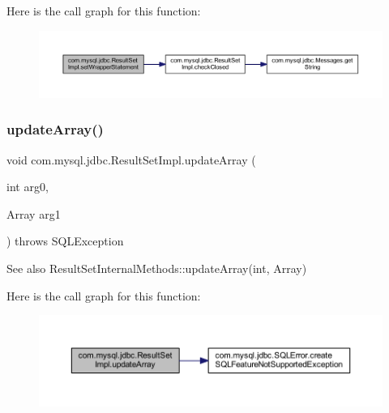Here is the call graph for this function\+:
\nopagebreak
\begin{figure}[H]
\begin{center}
\leavevmode
\includegraphics[width=350pt]{classcom_1_1mysql_1_1jdbc_1_1_result_set_impl_af945ea2fe5463f6d71b3af855fcf9dd5_cgraph}
\end{center}
\end{figure}
\mbox{\label{classcom_1_1mysql_1_1jdbc_1_1_result_set_impl_a0661c3eec2182123467ad3461928515c}} 
\subsubsection{\texorpdfstring{update\+Array()}{updateArray()}\hspace{0.1cm}{\footnotesize\ttfamily [1/2]}}
{\footnotesize\ttfamily void com.\+mysql.\+jdbc.\+Result\+Set\+Impl.\+update\+Array (\begin{DoxyParamCaption}\item[{int}]{arg0,  }\item[{Array}]{arg1 }\end{DoxyParamCaption}) throws S\+Q\+L\+Exception}

\begin{DoxySeeAlso}{See also}
Result\+Set\+Internal\+Methods\+::update\+Array(int, Array) 
\end{DoxySeeAlso}
Here is the call graph for this function\+:
\nopagebreak
\begin{figure}[H]
\begin{center}
\leavevmode
\includegraphics[width=350pt]{classcom_1_1mysql_1_1jdbc_1_1_result_set_impl_a0661c3eec2182123467ad3461928515c_cgraph}
\end{center}
\end{figure}
\mbox{\label{classcom_1_1mysql_1_1jdbc_1_1_result_set_impl_ac90a5310bf41f46bb61af696f0db1cfc}} 
